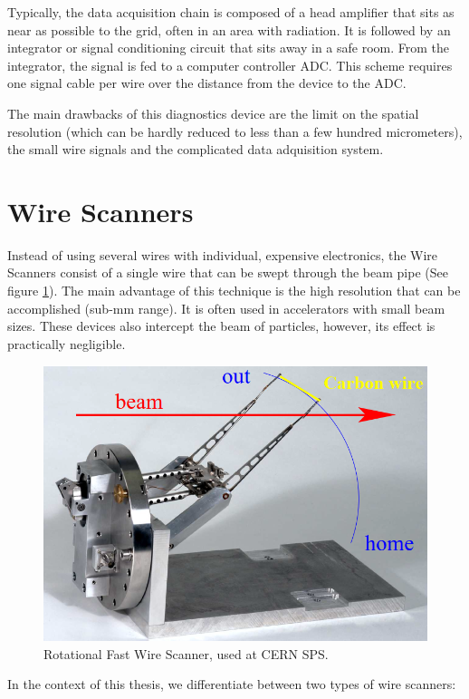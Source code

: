 Typically, the data acquisition chain is composed of a head amplifier that sits as near as possible to the grid, often in an area with radiation. It is followed by an integrator or signal conditioning circuit that sits away in a safe room. From the integrator, the signal is fed to a computer controller ADC. This scheme requires one signal cable per wire over the distance from the device to the ADC. 

The main drawbacks of this diagnostics device are the limit on the spatial resolution (which can be hardly reduced to less than a few hundred micrometers), the small wire signals and the complicated data adquisition system. 

\section{Wire Scanners}
\label{sec:WireScan}

Instead of using several wires with individual, expensive electronics, the Wire Scanners consist of a single wire that can be swept through the beam pipe (See figure \ref{fig:WireScan}). The main advantage of this technique is the high resolution that can be accomplished (sub-mm range). It is often used in accelerators with small beam sizes. These devices also intercept the beam of particles, however, its effect is practically negligible.

\begin{figure}[h]
    \centering
    \includegraphics[width=0.6\columnwidth]{WireScanner/WireScanner.png}
    \caption{Rotational Fast Wire Scanner, used at CERN SPS. }
    \label{fig:WireScan}
\end{figure}

In the context of this thesis, we differentiate between two types of wire scanners:

